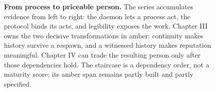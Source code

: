 \begin{figure}[H]
{}
\caption{\textbf{From process to priceable person.} The series accumulates evidence
from left to right: the daemon lets a process act, the protocol binds its acts,
and legibility exposes the work. Chapter III owns the two decisive
transformations in amber: continuity makes history survive a respawn, and a
witnessed history makes reputation meaningful. Chapter IV can trade the resulting
person only after those dependencies hold. The staircase is a dependency order,
not a maturity score; its amber span remains partly built and partly specified.}
\label{fig:stack}
\end{figure}
